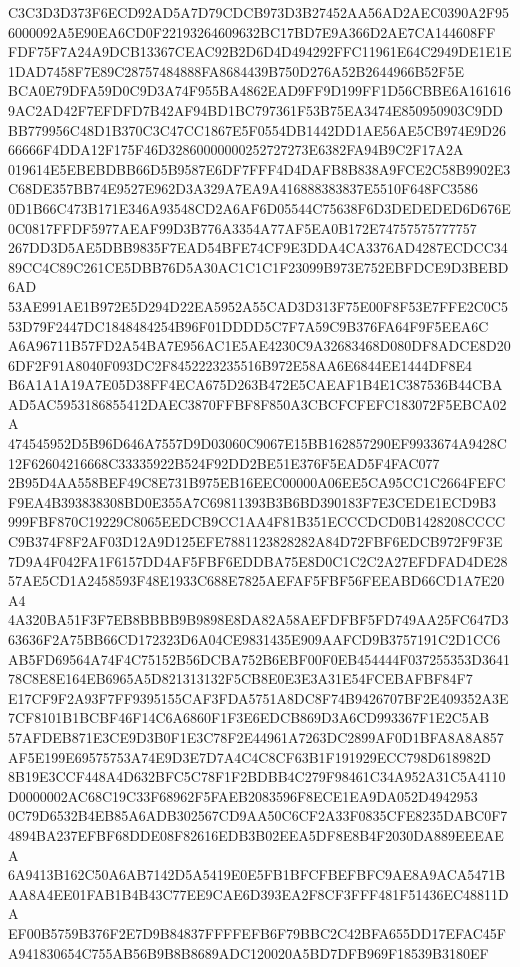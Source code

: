 \documentclass[UTF8,fontset=fandol,zihao=-4,a4paper]{ctexart}
\begin{document}
{{C3C3D3D373F6ECD92AD5A7D79CDCB973D3B27452AA56AD2AEC0390A2F956000092A5E90EA6CD0F22193264609632BC17BD7E9A366D2AE7CA144608FF
FDF75F7A24A9DCB13367CEAC92B2D6D4D494292FFC11961E64C2949DE1E1E1DAD7458F7E89C28757484888FA8684439B750D276A52B2644966B52F5E
BCA0E79DFA59D0C9D3A74F955BA4862EAD9FF9D199FF1D56CBBE6A1616169AC2AD42F7EFDFD7B42AF94BD1BC797361F53B75EA3474E850950903C9DD
BB779956C48D1B370C3C47CC1867E5F0554DB1442DD1AE56AE5CB974E9D2666666F4DDA12F175F46D32860000000252727273E6382FA94B9C2F17A2A
019614E5EBEBDBB66D5B9587E6DF7FFF4D4DAFB8B838A9FCE2C58B9902E3C68DE357BB74E9527E962D3A329A7EA9A416888383837E5510F648FC3586
0D1B66C473B171E346A93548CD2A6AF6D05544C75638F6D3DEDEDED6D676E0C0817FFDF5977AEAF99D3B776A3354A77AF5EA0B172E74757575777757
267DD3D5AE5DBB9835F7EAD54BFE74CF9E3DDA4CA3376AD4287ECDCC3489CC4C89C261CE5DBB76D5A30AC1C1C1F23099B973E752EBFDCE9D3BEBD6AD
53AE991AE1B972E5D294D22EA5952A55CAD3D313F75E00F8F53E7FFE2C0C553D79F2447DC1848484254B96F01DDDD5C7F7A59C9B376FA64F9F5EEA6C
A6A96711B57FD2A54BA7E956AC1E5AE4230C9A32683468D080DF8ADCE8D206DF2F91A8040F093DC2F8452223235516B972E58AA6E6844EE1444DF8E4
B6A1A1A19A7E05D38FF4ECA675D263B472E5CAEAF1B4E1C387536B44CBAAD5AC5953186855412DAEC3870FFBF8F850A3CBCFCFEFC183072F5EBCA02A
474545952D5B96D646A7557D9D03060C9067E15BB162857290EF9933674A9428C12F62604216668C33335922B524F92DD2BE51E376F5EAD5F4FAC077
2B95D4AA558BEF49C8E731B975EB16EEC00000A06EE5CA95CC1C2664FEFCF9EA4B393838308BD0E355A7C69811393B3B6BD390183F7E3CEDE1ECD9B3
999FBF870C19229C8065EEDCB9CC1AA4F81B351ECCCDCD0B1428208CCCCC9B374F8F2AF03D12A9D125EFE7881123828282A84D72FBF6EDCB972F9F3E
7D9A4F042FA1F6157DD4AF5FBF6EDDBA75E8D0C1C2C2A27EFDFAD4DE2857AE5CD1A2458593F48E1933C688E7825AEFAF5FBF56FEEABD66CD1A7E20A4
4A320BA51F3F7EB8BBBB9B9898E8DA82A58AEFDFBF5FD749AA25FC647D363636F2A75BB66CD172323D6A04CE9831435E909AAFCD9B3757191C2D1CC6
AB5FD69564A74F4C75152B56DCBA752B6EBF00F0EB454444F037255353D364178C8E8E164EB6965A5D821313132F5CB8E0E3E3A31E54FCEBAFBF84F7
E17CF9F2A93F7FF9395155CAF3FDA5751A8DC8F74B9426707BF2E409352A3E7CF8101B1BCBF46F14C6A6860F1F3E6EDCB869D3A6CD993367F1E2C5AB
57AFDEB871E3CE9D3B0F1E3C78F2E44961A7263DC2899AF0D1BFA8A8A857AF5E199E69575753A74E9D3E7D7A4C4C8CF63B1F191929ECC798D618982D
8B19E3CCF448A4D632BFC5C78F1F2BDBB4C279F98461C34A952A31C5A4110D0000002AC68C19C33F68962F5FAEB2083596F8ECE1EA9DA052D4942953
0C79D6532B4EB85A6ADB302567CD9AA50C6CF2A33F0835CFE8235DABC0F74894BA237EFBF68DDE08F82616EDB3B02EEA5DF8E8B4F2030DA889EEEAEA
6A9413B162C50A6AB7142D5A5419E0E5FB1BFCFBEFBFC9AE8A9ACA5471BAA8A4EE01FAB1B4B43C77EE9CAE6D393EA2F8CF3FFF481F51436EC48811DA
EF00B5759B376F2E7D9B84837FFFFEFB6F79BBC2C42BFA655DD17EFAC45FA941830654C755AB56B9B8B8689ADC120020A5BD7DFB969F18539B3180EF
}}
\end{document}

